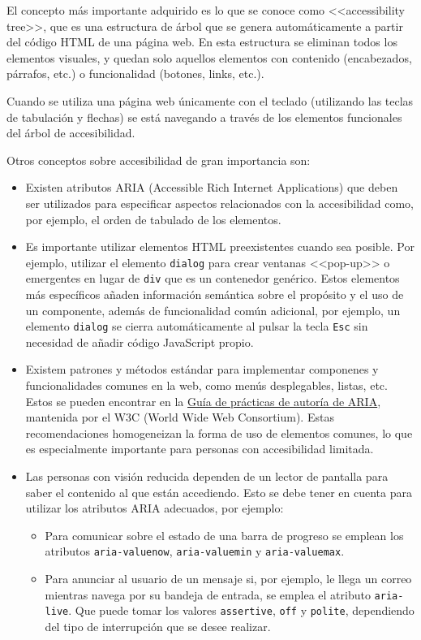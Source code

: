 El concepto más importante adquirido es lo que se conoce como <<accessibility
tree>>, que es una estructura de árbol que se genera automáticamente a partir
del código HTML de una página web. En esta estructura se eliminan todos los
elementos visuales, y quedan solo aquellos elementos con contenido (encabezados,
párrafos, etc.) o funcionalidad (botones, links, etc.).

Cuando se utiliza una página web únicamente con el teclado (utilizando las
teclas de tabulación y flechas) se está navegando a través de los elementos
funcionales del árbol de accesibilidad.

Otros conceptos sobre accesibilidad de gran importancia son:

\begin{itemize}
    \item Existen atributos ARIA (Accessible Rich Internet Applications) que
    deben ser utilizados para especificar aspectos relacionados con la
    accesibilidad como, por ejemplo, el orden de tabulado de los elementos.
    \item Es importante utilizar elementos HTML preexistentes cuando sea
    posible. Por ejemplo, utilizar el elemento \texttt{dialog} para crear
    ventanas <<pop-up>> o emergentes en lugar de \texttt{div} que es un
    contenedor genérico. Estos elementos más específicos añaden información
    semántica sobre el propósito y el uso de un componente, además de
    funcionalidad común adicional, por ejemplo, un elemento \texttt{dialog} se
    cierra automáticamente al pulsar la tecla \texttt{Esc} sin necesidad de
    añadir código JavaScript propio.
    \item Existem patrones y métodos estándar para implementar componenes y
    funcionalidades comunes en la web, como menús desplegables, listas, etc.
    Estos se pueden encontrar en la
    \href{https://www.w3.org/WAI/ARIA/apg/patterns/}{Guía de prácticas de
    autoría de ARIA}, mantenida por el W3C (World Wide Web Consortium). Estas
    recomendaciones homogeneizan la forma de uso de elementos comunes, lo que es
    especialmente importante para personas con accesibilidad limitada.
    \item Las personas con visión reducida dependen de un lector de pantalla
    para saber el contenido al que están accediendo. Esto se debe tener en
    cuenta para utilizar los atributos ARIA adecuados, por ejemplo:
        \begin{itemize}
            \item Para comunicar sobre el estado de una barra de progreso se
            emplean los atributos \texttt{aria-valuenow}, \texttt{aria-valuemin}
            y \texttt{aria-valuemax}.
            \item Para anunciar al usuario de un mensaje si, por ejemplo, le
            llega un correo mientras navega por su bandeja de entrada, se emplea
            el atributo \texttt{aria-live}. Que puede tomar los valores
            \texttt{assertive}, \texttt{off} y \texttt{polite}, dependiendo del
            tipo de interrupción que se desee realizar.
        \end{itemize}
\end{itemize}


